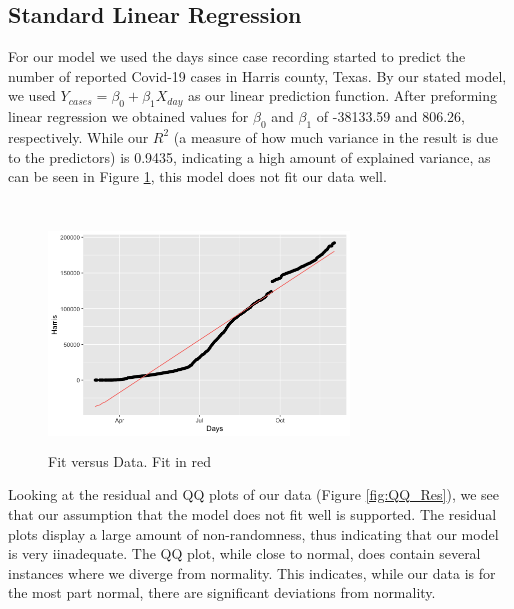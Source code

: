 \documentclass{article}
\begin{document}
\subsection{Standard Linear Regression}
For our model we used the days since case recording started to predict the number of reported Covid-19 cases in Harris county, Texas. By our stated model, we used $Y_{cases}=\beta_0+\beta_1X_{day}$ as our linear prediction function. After preforming linear regression we obtained values for $\beta_0$ and $\beta_1$ of -38133.59 and 806.26, respectively. While our $R^2$ (a measure of how much variance in the result is due to the predictors) is 0.9435, indicating a high amount of explained variance, as can be seen in Figure \ref{fig:Full_fit}, this model does not fit our data well.\\\\
\begin{figure}[H]
    \centering
    \includegraphics[width=8cm,height=6cm]{Full_fit.png}
    \caption{Fit versus Data. Fit in red}
    \label{fig:Full_fit}
\end{figure}
Looking at the residual and QQ plots of our data (Figure \ref{fig:QQ_Res}), we see that our assumption that the model does not fit well is supported. The residual plots display a large amount of non-randomness, thus indicating that our model is very iinadequate. The QQ plot, while close to normal, does contain several instances where we diverge from normality. This indicates, while our data is for the most part normal, there are significant deviations from normality.\\\\
\end{document}
